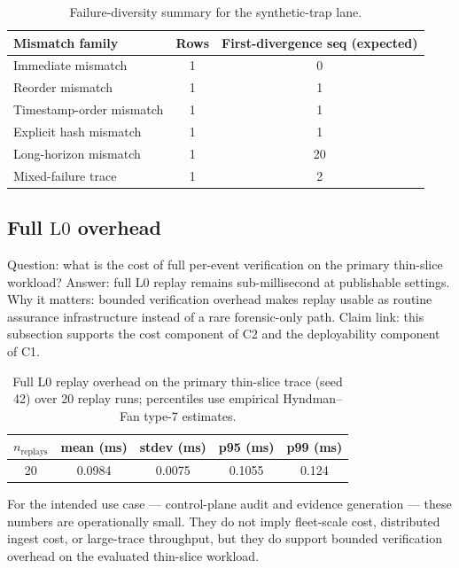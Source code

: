 \documentclass[11pt]{article}
\newcommand{\Lzero}{\ensuremath{\mathrm{L0}}}
\begin{document}
\begin{table}[H]
\centering
\caption{Failure-diversity summary for the synthetic-trap lane.}
\label{tab:failure-diversity}
\begin{tabular}{p{4.2cm}cc}
\toprule
Mismatch family & Rows & First-divergence seq (expected) \\
\midrule
Immediate mismatch & 1 & 0 \\
Reorder mismatch & 1 & 1 \\
Timestamp-order mismatch & 1 & 1 \\
Explicit hash mismatch & 1 & 1 \\
Long-horizon mismatch & 1 & 20 \\
Mixed-failure trace & 1 & 2 \\
\bottomrule
\end{tabular}
\end{table}

\subsection{Full \Lzero{} overhead}

Question: what is the cost of full per-event verification on the primary thin-slice workload?  
Answer: full \Lzero{} replay remains sub-millisecond at publishable settings.  
Why it matters: bounded verification overhead makes replay usable as routine assurance infrastructure instead of a rare forensic-only path.
Claim link: this subsection supports the cost component of C2 and the deployability component of C1.

\begin{table}[H]
\centering
\caption{Full \Lzero{} replay overhead on the primary thin-slice trace (seed 42) over 20 replay runs; percentiles use empirical Hyndman--Fan type-7 estimates.}
\label{tab:l0-overhead}
\begin{tabular}{ccccc}
\toprule
$n_{\text{replays}}$ & mean (ms) & stdev (ms) & p95 (ms) & p99 (ms) \\
\midrule
20 & 0.0984 & 0.0075 & 0.1055 & 0.124 \\
\bottomrule
\end{tabular}
\end{table}

For the intended use case --- control-plane audit and evidence generation --- these numbers are operationally small. They do not imply fleet-scale cost, distributed ingest cost, or large-trace throughput, but they do support bounded verification overhead on the evaluated thin-slice workload.
\end{document}

